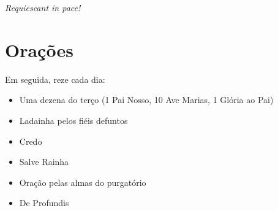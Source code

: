 \begin{center}\textit{Requiescant in pace!}\end{center}


\section*{Orações }

Em seguida, reze cada dia:

\begin{itemize}
  \item Uma dezena do terço (1 Pai Nosso, 10 Ave Marias, 1 Glória ao Pai)
  \item Ladainha pelos fiéis defuntos
  \item Credo
  \item Salve Rainha
  \item Oração pelas almas do purgatório
  \item De Profundis
\end{itemize}
